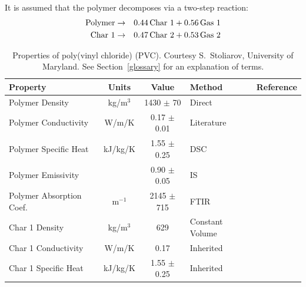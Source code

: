 It is assumed that the polymer decomposes via a two-step reaction:
\begin{eqnarray}
   \hbox{Polymer} &\to& 0.44 \, \hbox{Char 1} + 0.56 \, \hbox{Gas 1}  \\
   \hbox{Char 1}  &\to& 0.47 \, \hbox{Char 2} + 0.53 \, \hbox{Gas 2}
\end{eqnarray}


\begin{table}[h!]
\caption[Properties of poly(vinyl chloride) (PVC).]{Properties of poly(vinyl chloride) (PVC). Courtesy S.~Stoliarov, University of Maryland. See Section~\ref{glossary} for an explanation of terms.}
\begin{center}
\begin{tabular}{|l|c|c|l|l|}
\hline
Property                    & Units         & Value                             & Method                    &  Reference                                \\ \hline \hline
Polymer Density             & kg/m$^3$      & 1430 $\pm$ 70                     & Direct                    &  \cite{Stoliarov:CF2010}                  \\ \hline
Polymer Conductivity        & W/m/K         & 0.17 $\pm$ 0.01                   & Literature                &  \cite{Stoliarov:CF2010}                  \\ \hline
Polymer Specific Heat       & kJ/kg/K       & 1.55 $\pm$ 0.25                   & DSC                       &  \cite{Stoliarov:PDS2008}                 \\ \hline
Polymer Emissivity          &               & 0.90 $\pm$ 0.05                   & IS                        &  \cite{Hallman:PES1974}                   \\ \hline
Polymer Absorption Coef.    & m$^{-1}$      & 2145 $\pm$ 715                    & FTIR                      &  \cite{Tsilingiris:ECM2003}               \\ \hline
Char 1 Density              & kg/m$^3$      & 629                               & Constant Volume           &  \cite{Stoliarov:CF2010}                  \\ \hline
Char 1 Conductivity         & W/m/K         & 0.17                              & Inherited                 &  \cite{Stoliarov:CF2010}                  \\ \hline
Char 1 Specific Heat        & kJ/kg/K       & 1.55 $\pm$ 0.25                   & Inherited                 &  \cite{Stoliarov:CF2010}                  \\ \hline

\end{tabular}
\end{center}
\end{table}
